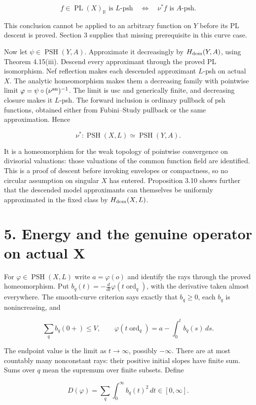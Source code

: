 \documentclass[11pt]{article}
\begin{document}
\[
 f\in\operatorname{PL}(X)_{\mathbb R}\text{ is }L\text{-psh}
 \quad\Longleftrightarrow\quad
 \nu^*f\text{ is }A\text{-psh}.
\]

This conclusion cannot be applied to an arbitrary function on $Y$ before its PL descent is proved. Section 3 supplies that missing prerequisite in this curve case.

Now let $\psi\in\operatorname{PSH}(Y,A)$. Approximate it decreasingly by $H_{\rm dom}(Y,A)$, using Theorem 4.15(iii). Descend every approximant through the proved PL isomorphism. Nef reflection makes each descended approximant $L$-psh on actual $X$. The analytic homeomorphism makes them a decreasing family with pointwise limit $\varphi=\psi\circ(\nu^{\rm an})^{-1}$. The limit is usc and generically finite, and decreasing closure makes it $L$-psh. The forward inclusion is ordinary pullback of psh functions, obtained either from Fubini--Study pullback or the same approximation. Hence

\[
 \nu^*:\operatorname{PSH}(X,L)\simeq\operatorname{PSH}(Y,A).
\]

It is a homeomorphism for the weak topology of pointwise convergence on divisorial valuations: those valuations of the common function field are identified. This is a proof of descent before invoking envelopes or compactness, so no circular assumption on singular $X$ has entered. Proposition 3.10 shows further that the descended model approximants can themselves be uniformly approximated in the fixed class by $H_{\rm dom}(X,L)$.

\section*{5. Energy and the genuine operator on actual X}
For $\varphi\in\operatorname{PSH}(X,L)$ write $a=\varphi(o)$ and identify the rays through the proved homeomorphism. Put $b_q(t)=-\frac{d}{dt}\varphi(t\operatorname{ord}_q)$, with the derivative taken almost everywhere. The smooth-curve criterion says exactly that $b_q\geq0$, each $b_q$ is nonincreasing, and

\[
 \sum_q b_q(0+)\leq V,\qquad
 \varphi(t\operatorname{ord}_q)=a-\int_0^t b_q(s)\,ds.
\]

The endpoint value is the limit as $t\to\infty$, possibly $-\infty$. There are at most countably many nonconstant rays: their positive initial slopes have finite sum. Sums over $q$ mean the supremum over finite subsets. Define

\[
 D(\varphi)=\sum_q\int_0^\infty b_q(t)^2\,dt\in[0,\infty].
\]
\end{document}
